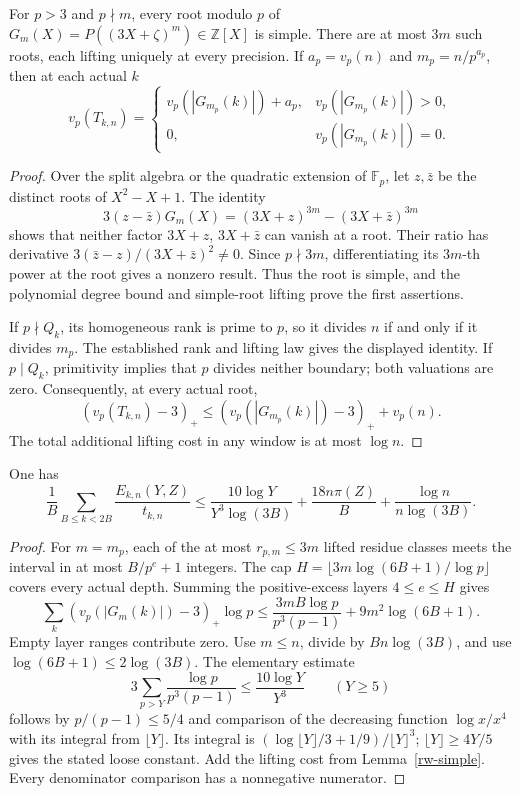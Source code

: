 \begin{lemma}
\label{rw-simple}
For $p>3$ and $p\nmid m$, every root modulo $p$ of
$G_m(X)=P((3X+\zeta)^m)\in\mathbb Z[X]$ is simple. There are at
most $3m$ such roots, each lifting uniquely at every precision.
If $a_p=v_p(n)$ and $m_p=n/p^{a_p}$, then at each actual $k$
\[
 v_p(T_{k,n})=
 \begin{cases}
 v_p(|G_{m_p}(k)|)+a_p,&v_p(|G_{m_p}(k)|)>0,\\
 0,&v_p(|G_{m_p}(k)|)=0.
 \end{cases}
\]
\end{lemma}
\begin{proof}
Over the split algebra or the quadratic extension of $\mathbb F_p$,
let $z,\bar z$ be the distinct roots of $X^2-X+1$. The identity
\[
 3(z-\bar z)G_m(X)
   =(3X+z)^{3m}-(3X+\bar z)^{3m}
\]
shows that neither factor $3X+z$, $3X+\bar z$ can vanish at a root.
Their ratio has derivative $3(\bar z-z)/(3X+\bar z)^2\ne0$.
Since $p\nmid3m$, differentiating its $3m$-th power at the root
gives a nonzero result. Thus the root is simple, and the polynomial
degree bound and simple-root lifting prove the first assertions.

If $p\nmid Q_k$, its homogeneous rank is prime to $p$, so it
divides $n$ if and only if it divides $m_p$. The established rank
and lifting law gives the displayed identity. If $p\mid Q_k$,
primitivity implies that $p$ divides neither boundary; both
valuations are zero. Consequently, at every actual root,
\[
 (v_p(T_{k,n})-3)_+
 \le (v_p(|G_{m_p}(k)|)-3)_++v_p(n).
\]
The total additional lifting cost in any window is at most $\log n$.
\end{proof}

\begin{proposition}
\label{rw-unstratified}
One has
\[
 \frac1B\sum_{B\le k<2B}\frac{E_{k,n}(Y,Z)}{t_{k,n}}
 \le \frac{10\log Y}{Y^3\log(3B)}
       +\frac{18n\pi(Z)}B+\frac{\log n}{n\log(3B)}.
\]
\end{proposition}
\begin{proof}
For $m=m_p$, each of the at most $r_{p,m}\le3m$ lifted residue
classes meets the interval in at most $B/p^e+1$ integers. The cap
$H=\lfloor3m\log(6B+1)/\log p\rfloor$ covers every actual depth.
Summing the positive-excess layers $4\le e\le H$ gives
\[
 \sum_k(v_p(|G_m(k)|)-3)_+\log p
 \le\frac{3mB\log p}{p^3(p-1)}+9m^2\log(6B+1).
\]
Empty layer ranges contribute zero. Use $m\le n$, divide by
$Bn\log(3B)$, and use $\log(6B+1)\le2\log(3B)$.
The elementary estimate
\begin{equation}\label{rw-prime-series}
 3\sum_{p>Y}\frac{\log p}{p^3(p-1)}
       \le\frac{10\log Y}{Y^3}\qquad(Y\ge5)
\end{equation}
follows by $p/(p-1)\le5/4$ and comparison of the decreasing
function $\log x/x^4$ with its integral from $\lfloor Y\rfloor$.
Its integral is $(\log\lfloor Y\rfloor/3+1/9)/\lfloor Y\rfloor^3$;
$\lfloor Y\rfloor\ge4Y/5$ gives the stated loose constant.
Add the lifting cost from Lemma~\ref{rw-simple}. Every denominator
comparison has a nonnegative numerator.
\end{proof}

